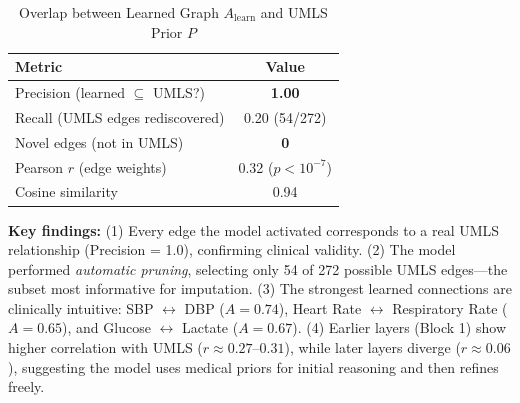 \begin{table}[h]
\centering
\caption{Overlap between Learned Graph $A_{\text{learn}}$ and UMLS Prior $P$}
\label{tab:graph_overlap}
\begin{tabular}{@{}lc@{}}
\toprule
\textbf{Metric} & \textbf{Value} \\ \midrule
Precision (learned $\subseteq$ UMLS?)   & \textbf{1.00} \\
Recall (UMLS edges rediscovered)         & 0.20 (54/272) \\
Novel edges (not in UMLS)                & \textbf{0} \\
Pearson $r$ (edge weights)               & 0.32 ($p < 10^{-7}$) \\
Cosine similarity                        & 0.94 \\ \bottomrule
\end{tabular}
\end{table}

\textbf{Key findings:} (1) Every edge the model activated corresponds to a real UMLS relationship (Precision = 1.0), confirming clinical validity. (2) The model performed \textit{automatic pruning}, selecting only 54 of 272 possible UMLS edges---the subset most informative for imputation. (3) The strongest learned connections are clinically intuitive: SBP $\leftrightarrow$ DBP ($A=0.74$), Heart Rate $\leftrightarrow$ Respiratory Rate ($A=0.65$), and Glucose $\leftrightarrow$ Lactate ($A=0.67$). (4) Earlier layers (Block 1) show higher correlation with UMLS ($r \approx 0.27$--$0.31$), while later layers diverge ($r \approx 0.06$), suggesting the model uses medical priors for initial reasoning and then refines freely.

